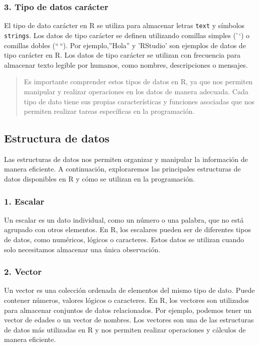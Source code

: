 \documentclass[
  a4paper,
]{article}
\begin{document}
\subsubsection{3. Tipo de datos
carácter}\label{tipo-de-datos-caruxe1cter}

El tipo de dato carácter en R se utiliza para almacenar letras
\texttt{text} y símbolos \texttt{strings}. Los datos de tipo carácter se
definen utilizando comillas simples ('\,`) o comillas dobles (``\,``).
Por ejemplo,''Hola'' y 'RStudio' son ejemplos de datos de tipo carácter
en R. Los datos de tipo carácter se utilizan con frecuencia para
almacenar texto legible por humanos, como nombres, descripciones o
mensajes.

\begin{quote}
Es importante comprender estos tipos de datos en R, ya que nos permiten
manipular y realizar operaciones en los datos de manera adecuada. Cada
tipo de dato tiene sus propias características y funciones asociadas que
nos permiten realizar tareas específicas en la programación.
\end{quote}

\subsection{Estructura de datos}\label{estructura-de-datos}

Las estructuras de datos nos permiten organizar y manipular la
información de manera eficiente. A continuación, exploraremos las
principales estructuras de datos disponibles en R y cómo se utilizan en
la programación.

\subsubsection{1. Escalar}\label{escalar}

Un escalar es un dato individual, como un número o una palabra, que no
está agrupado con otros elementos. En R, los escalares pueden ser de
diferentes tipos de datos, como numéricos, lógicos o caracteres. Estos
datos se utilizan cuando solo necesitamos almacenar una única
observación.

\subsubsection{2. Vector}\label{vector}

Un vector es una colección ordenada de elementos del mismo tipo de dato.
Puede contener números, valores lógicos o caracteres. En R, los vectores
son utilizados para almacenar conjuntos de datos relacionados. Por
ejemplo, podemos tener un vector de edades o un vector de nombres. Los
vectores son una de las estructuras de datos más utilizadas en R y nos
permiten realizar operaciones y cálculos de manera eficiente.
\end{document}
